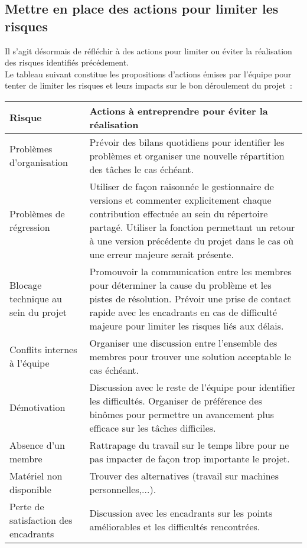 \documentclass[a4paper,11pt]{article}
\begin{document}
\subsection{Mettre en place des actions pour limiter les risques}

Il s'agit désormais de réfléchir à des actions pour limiter ou éviter la réalisation des risques identifiés précédement.\\

Le tableau suivant constitue les propositions d'actions émises par l'équipe pour tenter de limiter les risques et leurs impacts sur le bon déroulement du projet~: \\
\hspace{-3cm}
\begin{tabular}{|p{4cm}||p{14cm}|}
\hline  
   Risque & Actions à entreprendre pour éviter la réalisation \\
\hline
\hline
   Problèmes d'organisation & Prévoir des bilans quotidiens pour 
identifier les problèmes et organiser une nouvelle répartition des tâches le cas échéant. \\
\hline
   Problèmes de régression & Utiliser de façon raisonnée le gestionnaire de versions et 
commenter explicitement chaque contribution effectuée au sein du répertoire partagé. Utiliser la fonction permettant un retour à une version précédente du projet dans le cas où une erreur majeure serait présente.\\
\hline
Blocage technique au sein du projet & Promouvoir la communication entre les membres pour déterminer la cause du problème et les pistes de résolution. Prévoir une prise de contact rapide avec les encadrants en cas de difficulté majeure pour limiter les risques liés aux délais.\\
\hline
   Conflits internes à l'équipe & Organiser une discussion entre l'ensemble des membres pour trouver une solution acceptable le cas échéant.\\
\hline
   Démotivation & Discussion avec le reste de l'équipe pour identifier les difficultés. Organiser de préférence des binômes pour permettre un avancement plus efficace sur les tâches difficiles.\\
\hline
   Absence d'un membre & Rattrapage du travail sur le temps libre pour ne pas impacter de façon trop importante le projet.\\
\hline
   Matériel non disponible & Trouver des alternatives (travail sur machines personnelles,...).\\   
\hline
   Perte de satisfaction des encadrants & Discussion avec les encadrants sur les points améliorables et les difficultés rencontrées.\\ 

\hline
\end{tabular}\\
\end{document}
